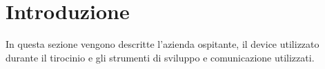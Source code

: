\chapter{Introduzione}
\label{cap:introduzione}





In questa sezione vengono descritte l'azienda ospitante, il device utilizzato durante il tirocinio e gli strumenti di sviluppo e comunicazione utilizzati.

